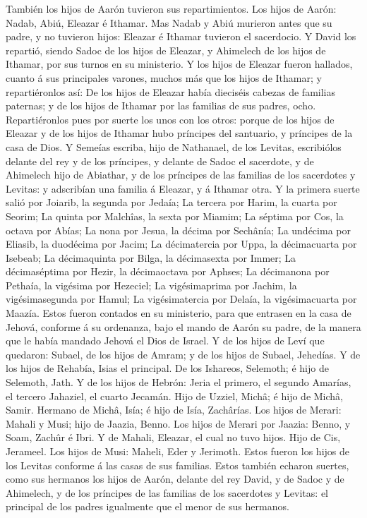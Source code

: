  También los hijos de Aarón tuvieron sus repartimientos.
Los hijos de Aarón: Nadab, Abiú, Eleazar é Ithamar.  Mas
Nadab y Abiú murieron antes que su padre, y no tuvieron hijos: Eleazar é
Ithamar tuvieron el sacerdocio.  Y David los repartió,
siendo Sadoc de los hijos de Eleazar, y Ahimelech de los hijos de
Ithamar, por sus turnos en su ministerio.  Y los hijos de
Eleazar fueron hallados, cuanto á sus principales varones, muchos más
que los hijos de Ithamar; y repartiéronlos así: De los hijos de Eleazar
había dieciséis cabezas de familias paternas; y de los hijos de Ithamar
por las familias de sus padres, ocho.  Repartiéronlos pues
por suerte los unos con los otros: porque de los hijos de Eleazar y de
los hijos de Ithamar hubo príncipes del santuario, y príncipes de la
casa de Dios.  Y Semeías escriba, hijo de Nathanael, de
los Levitas, escribiólos delante del rey y de los príncipes, y delante
de Sadoc el sacerdote, y de Ahimelech hijo de Abiathar, y de los
príncipes de las familias de los sacerdotes y Levitas: y adscribían una
familia á Eleazar, y á Ithamar otra.  Y la primera suerte
salió por Joiarib, la segunda por Jedaía;  La tercera por
Harim, la cuarta por Seorim;  La quinta por Malchîas, la
sexta por Miamim;  La séptima por Cos, la octava por
Abías;  La nona por Jesua, la décima por Sechânía;
 La undécima por Eliasib, la duodécima por Jacim;
 La décimatercia por Uppa, la décimacuarta por Isebeab;
 La décimaquinta por Bilga, la décimasexta por Immer;
 La décimaséptima por Hezir, la décimaoctava por Aphses;
 La décimanona por Pethaía, la vigésima por Hezeciel;
 La vigésimaprima por Jachim, la vigésimasegunda por
Hamul;  La vigésimatercia por Delaía, la vigésimacuarta
por Maazía.  Estos fueron contados en su ministerio, para
que entrasen en la casa de Jehová, conforme á su ordenanza, bajo el
mando de Aarón su padre, de la manera que le había mandado Jehová el
Dios de Israel.  Y de los hijos de Leví que quedaron:
Subael, de los hijos de Amram; y de los hijos de Subael, Jehedías.
 Y de los hijos de Rehabía, Isias el principal.
 De los Ishareos, Selemoth; é hijo de Selemoth, Jath.
 Y de los hijos de Hebrón: Jeria el primero, el segundo
Amarías, el tercero Jahaziel, el cuarto Jecamán.  Hijo de
Uzziel, Michâ; é hijo de Michâ, Samir.  Hermano de Michâ,
Isía; é hijo de Isía, Zachârías.  Los hijos de Merari:
Mahali y Musi; hijo de Jaazia, Benno.  Los hijos de
Merari por Jaazia: Benno, y Soam, Zachûr é Ibri.  Y de
Mahali, Eleazar, el cual no tuvo hijos.  Hijo de Cis,
Jerameel.  Los hijos de Musi: Maheli, Eder y Jerimoth.
Estos fueron los hijos de los Levitas conforme á las casas de sus
familias.  Estos también echaron suertes, como sus
hermanos los hijos de Aarón, delante del rey David, y de Sadoc y de
Ahimelech, y de los príncipes de las familias de los sacerdotes y
Levitas: el principal de los padres igualmente que el menor de sus
hermanos.

